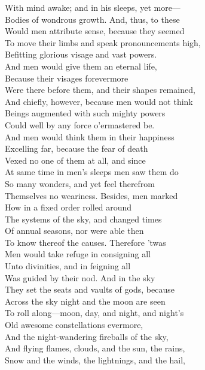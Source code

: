 With mind awake; and in his sleeps, yet more—\\
Bodies of wondrous growth. And, thus, to these\\
Would men attribute sense, because they seemed\\
To move their limbs and speak pronouncements high,\\
Befitting glorious visage and vast powers.\\
And men would give them an eternal life,\\
Because their visages forevermore\\
Were there before them, and their shapes remained,\\
And chiefly, however, because men would not think\\
Beings augmented with such mighty powers\\
Could well by any force o'ermastered be.\\
And men would think them in their happiness\\
Excelling far, because the fear of death\\
Vexed no one of them at all, and since\\
At same time in men's sleeps men saw them do\\
So many wonders, and yet feel therefrom\\
Themselves no weariness. Besides, men marked\\
How in a fixed order rolled around\\
The systems of the sky, and changed times\\
Of annual seasons, nor were able then\\
To know thereof the causes. Therefore 'twas\\
Men would take refuge in consigning all\\
Unto divinities, and in feigning all\\
Was guided by their nod. And in the sky\\
They set the seats and vaults of gods, because\\
Across the sky night and the moon are seen\\
To roll along—moon, day, and night, and night's\\
Old awesome constellations evermore,\\
And the night-wandering fireballs of the sky,\\
And flying flames, clouds, and the sun, the rains,\\
Snow and the winds, the lightnings, and the hail,\\
